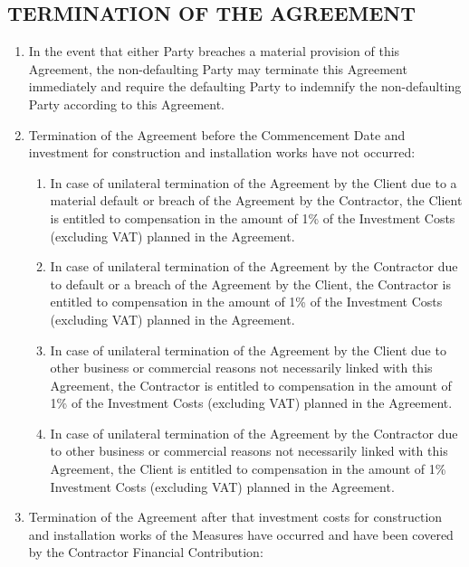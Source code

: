 \begin{multicols}{2}
\subsection{TERMINATION OF THE AGREEMENT}
\begin{enumerate}
	\item	In the event that either Party breaches a material provision of this Agreement, the non-defaulting Party may terminate this Agreement immediately and require the defaulting Party to indemnify the non-defaulting Party according to this Agreement.
	\item	Termination of the Agreement before the Commencement Date and investment for construction and installation works have not occurred:
	\begin{enumerate}
		\item	In case of unilateral termination of the Agreement by the Client due to a material default or breach of the Agreement by the Contractor, the Client is entitled to compensation in the amount of 1\% of the Investment Costs (excluding VAT) planned in the Agreement.
		\item	In case of unilateral termination of the Agreement by the Contractor due to default or a breach of the Agreement by the Client, the Contractor is entitled to compensation in the amount of 1\% of the Investment Costs (excluding VAT) planned in the Agreement.
		\item	In case of unilateral termination of the Agreement by the Client due to other business or commercial reasons not necessarily linked with this Agreement, the Contractor is entitled to compensation in the amount of 1\% of the Investment Costs (excluding VAT) planned in the Agreement.
		\item	In case of unilateral termination of the Agreement by the Contractor due to other business or commercial reasons not necessarily linked with this Agreement, the Client is entitled to compensation in the amount of 1\% Investment Costs (excluding VAT) planned in the Agreement.
	\end{enumerate}
	\item	Termination of the Agreement after that investment costs for construction and installation works of the Measures have occurred and have been covered by the Contractor Financial Contribution:
	\begin{enumerate}

\end{enumerate}
\end{enumerate}
\end{multicols}
